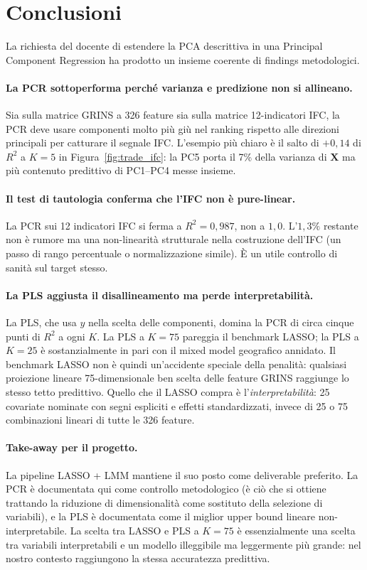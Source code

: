 \documentclass[11pt,a4paper]{article}
\begin{document}
\section{Conclusioni}

La richiesta del docente di estendere la PCA descrittiva in una
Principal Component Regression ha prodotto un insieme coerente di
findings metodologici.

\paragraph{La PCR sottoperforma perché varianza e predizione non si allineano.}
Sia sulla matrice GRINS a 326 feature sia sulla matrice
12-indicatori IFC, la PCR deve usare componenti molto più giù nel
ranking rispetto alle direzioni principali per catturare il
segnale IFC. L'esempio più chiaro è il salto di \(+0{,}14\) di
\(R^{2}\) a \(K = 5\) in Figura~\ref{fig:trade_ifc}: la PC5 porta
il 7\% della varianza di \(\mathbf{X}\) ma più contenuto predittivo
di PC1--PC4 messe insieme.

\paragraph{Il test di tautologia conferma che l'IFC non è pure-linear.}
La PCR sui 12 indicatori IFC si ferma a \(R^{2} = 0{,}987\), non a
\(1{,}0\). L'\(1{,}3\%\) restante non è rumore ma una
non-linearità strutturale nella costruzione dell'IFC (un passo di
rango percentuale o normalizzazione simile). È un utile controllo
di sanità sul target stesso.

\paragraph{La PLS aggiusta il disallineamento ma perde interpretabilità.}
La PLS, che usa \(y\) nella scelta delle componenti, domina la PCR
di circa cinque punti di \(R^{2}\) a ogni \(K\). La PLS a
\(K = 75\) pareggia il benchmark LASSO; la PLS a \(K = 25\) è
sostanzialmente in pari con il mixed model geografico annidato. Il
benchmark LASSO non è quindi un'accidente speciale della penalità:
qualsiasi proiezione lineare 75-dimensionale ben scelta delle
feature GRINS raggiunge lo stesso tetto predittivo. Quello che il
LASSO compra è l'\emph{interpretabilità}: 25 covariate nominate
con segni espliciti e effetti standardizzati, invece di 25 o 75
combinazioni lineari di tutte le 326 feature.

\paragraph{Take-away per il progetto.}
La pipeline LASSO + LMM mantiene il suo posto come deliverable
preferito. La PCR è documentata qui come controllo metodologico
(è ciò che si ottiene trattando la riduzione di dimensionalità
come sostituto della selezione di variabili), e la PLS è
documentata come il miglior upper bound lineare non-interpretabile.
La scelta tra LASSO e PLS a \(K = 75\) è essenzialmente una
scelta tra variabili interpretabili e un modello illeggibile ma
leggermente più grande: nel nostro contesto raggiungono la stessa
accuratezza predittiva.
\end{document}
